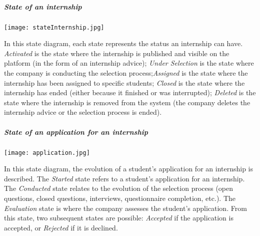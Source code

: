 				\subparagraph{State of an internship}
					\begin{center}
						\texttt{[image: stateInternship.jpg]}
					\end{center}
					
					In this state diagram, each state represents the status an internship can have. \textit{Activated} is the state where the internship is published and visible on the platform (in the form of an internship advice); \textit{Under Selection} is the state where the company is conducting the selection process;\textit{Assigned} is the state where the internship has been assigned to specific students; \textit{Closed} is the state where the internship has ended (either because it finished or was interrupted); \textit{Deleted} is the state where the internship is removed from the system (the company deletes the internship advice or the selection process is ended).
					
				\subparagraph{State of an application for an internship}
					\begin{center}
						\texttt{[image: application.jpg]}
					\end{center}
					
					In this state diagram, the evolution of a student's application for an internship is described. The \textit{Started} state refers to a student's application for an internship. The \textit{Conducted} state relates to the evolution of the selection process (open questions, closed questions, interviews, questionnaire completion, etc.). The \textit{Evaluation} state is where the company assesses the student's application. From this state, two subsequent states are possible: \textit{Accepted} if the application is accepted, or \textit{Rejected} if it is declined.
					
